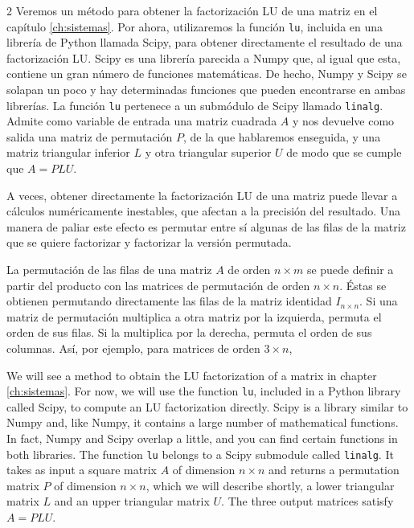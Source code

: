 \begin{paracol}{2}
Veremos un método para obtener la factorización LU de una matriz en el capítulo \ref{ch:sistemas}. Por ahora, utilizaremos la función \texttt{lu}, incluida en una librería de Python llamada Scipy, para obtener directamente el resultado de una factorización LU. Scipy es una librería parecida a Numpy que, al igual que esta, contiene un gran número de funciones matemáticas. De hecho, Numpy y Scipy se solapan un poco y hay determinadas funciones que pueden encontrarse en ambas librerías. La función \texttt{lu} pertenece a un submódulo de Scipy llamado \texttt{linalg}. Admite como variable de entrada una matriz cuadrada $A$ y nos devuelve como salida una matriz de permutación $P$, de la que hablaremos enseguida, y una matriz triangular inferior $L$ y otra triangular superior $U$ de modo que se cumple que $A =PLU$.

A veces, obtener directamente la factorización LU de una matriz puede llevar a cálculos numéricamente inestables, que afectan a la precisión del resultado. Una manera de paliar este efecto es permutar entre sí algunas de las filas de la matriz que se quiere factorizar y factorizar la versión permutada.

La permutación de las filas de una matriz $A$ de orden $n\times m$ se puede definir a partir del producto con las matrices de permutación de orden $n \times n$. Éstas se obtienen permutando directamente las filas de la matriz identidad $I_{n \times n}$. Si una matriz de permutación multiplica a otra matriz por la izquierda, permuta el orden de sus filas. Si la multiplica por la derecha, permuta el orden de sus columnas. Así, por ejemplo, para matrices de orden $3 \times n$,

\switchcolumn
We will see a method to obtain the LU factorization of a matrix in chapter \ref{ch:sistemas}. For now, we will use the function \texttt{lu}, included in a Python library called Scipy, to compute an LU factorization directly. Scipy is a library similar to Numpy and, like Numpy, it contains a large number of mathematical functions. In fact, Numpy and Scipy overlap a little, and you can find certain functions in both libraries. The function \texttt{lu} belongs to a Scipy submodule called \texttt{linalg}. It takes as input a square matrix $A$ of dimension $n\times n$ and returns a permutation matrix $P$ of dimension $n\times n$, which we will describe shortly, a lower triangular matrix $L$ and an upper triangular matrix $U$. The three output matrices satisfy $A=PLU$.


\end{paracol}
